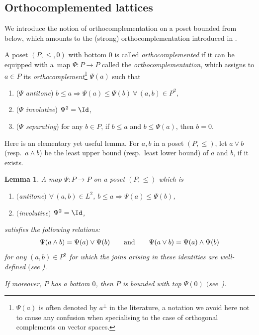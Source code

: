 \documentclass[pdftex]{sigma}
\numberwithin{equation}{section}
\newtheorem{Lemma}[Theorem]{Lemma}
\newcommand{\pone}{separating\xspace }
\begin{document}
\subsection{ Orthocomplemented lattices}
We introduce the notion of orthocomplementation on a poset bounded from below, which amounts to the (strong) orthocomplementation introduced in \cite[Remark below Proposition~1.7]{CM}.

\begin{Definition} \label{defn:orthocomplementmap}
A poset $(P, \leq, 0)$ with bottom $0$ is called {\it orthocomplemented} if it can be equipped with a~map $\Psi\colon P\to P$ called the {\it orthocomplementation}, which assigns to $a\in P$ its {\it orthocomplement}\footnote{$\Psi(a)$ is often denoted by $a^\perp$ in the literature, a notation we avoid here not to cause any confusion when specialising to the case of orthogonal complements on vector spaces.} $\Psi(a)$ such that
\begin{enumerate}\itemsep=0pt
\item[$(a)$] ({\it $\Psi$ antitone})
 $b\leq a\Rightarrow\Psi(a)\leq \Psi(b)\ \forall\, (a, b)\in P^2$,
\item[$(b)$]
({\it $\Psi$ involutive})
$\Psi^2=\Id$,
\item[$(c)$] ({\it $\Psi$ \pone })
for any $b\in P$, if $b\leq a$ and $b\leq \Psi(a)$, then $b=0$.
\end{enumerate}
\end{Definition}
Here is an elementary yet useful lemma.
For $a, b$ in a poset $(P,\leq)$, let $a\vee b$ (resp.~$a\wedge b$) be the least upper bound (resp.~least lower bound) of $a$ and $b$, if it exists.

\begin{Lemma} %
A map $\Psi\colon P\to P$ on a poset $(P, \leq)$ which is
\begin{enumerate}\itemsep=0pt
\item[$(a)$] $(${\it antitone}$)$
			$\forall\, (a, b)\in L^2$, $b\leq a\Rightarrow\Psi(a)\leq \Psi(b)$,
\item[$(b)$]
			$(${\it involutive}$)$
			$\Psi^2=\Id$,
\end{enumerate}
		satisfies the following relations:
		\begin{gather*}%
		\Psi(a \wedge b)=\Psi(a)\vee\Psi(b)\qquad {\rm and}\qquad \Psi(a \vee b)=\Psi(a )\wedge\Psi(b) \end{gather*}
for any $(a , b)\in P^2$ for which the joins arising in these identities are well-defined $($see {\rm\cite[Proposition~1.3(iii)]{CM})}.
		
		If moreover, $P$ has a bottom $0$, then $P$ is bounded with top $\Psi(0)$
		$($see~{\rm\cite[Proposition~1.3(iii)]{CM})}.
\end{Lemma}
\end{document}
